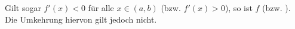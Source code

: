 Gilt sogar $f'(x) < 0$ für alle $x \in (a, b)$ (bzw. $f'(x) > 0$), so ist $f$  (bzw. ). Die Umkehrung hiervon gilt jedoch nicht.